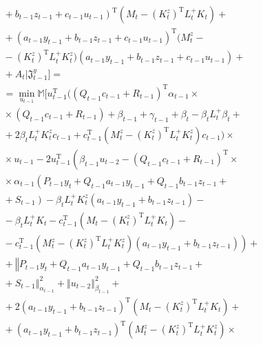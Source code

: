 \begin{multicols}{2}
\noindent
\begin{multline*}
\left.{}+ b_{t-1} z_{t-1} + c_{t-1} u_{t-1} \right)^{\mathrm{T}}
\left(M_t - \left( K_t^z\right)^{\mathrm{T}} L_t^+ K_t \right) +{}\\
{}+ \left( a_{t-1} y_{t-1} + b_{t-1} z_{t-1} + c_{t-1} u_{t-1} \right)^{\mathrm{T}}
\Big(M_t^z -{}\\
{}- \left( K_t^z\right)^{\mathrm{T}} L_t^+ K_t^z \Big)
\left( a_{t-1} y_{t-1} + b_{t-1} z_{t-1} + c_{t-1} u_{t-1} \right) +{}\\
{}+A_t \Big\vert
\mathfrak{J}_{t-1}^y\Big]  ={}\\
= \min\limits_{u_{t-1}} \mathbb{M} \Big[
u_{t-1}^{\mathrm{T}} \Big(
 \left( Q_{t-1} c_{t-1} + R_{t-1}\right)^{\mathrm{T}} \alpha_{t-1}\times\\
 {}\times
\left( Q_{t-1} c_{t-1} + R_{t-1}\right) + \beta_{t-1} + \gamma_{t-1} +
\beta_t -\beta_t L_t^+ \beta_t
+{}\\
{}+ 2 \beta_t L_t^+ K_t^z c_{t-1} + c_{t-1}^{\mathrm{T}}
\left(M_t^z - \left( K_t^z\right)^{\mathrm{T}} L_t^+ K_t^z \right) c_{t-1} %
\Big)\times{}\\
{}\times u_{t-1} - 2 u_{t-1}^{\mathrm{T}} \left(
\beta_{t-1} u_{t-2} - \left(Q_{t-1} c_{t-1} + R_{t-1}\right)^{\mathrm{T}}\times{}\right.\\
{}\times \alpha_{t-1}
\left(P_{t-1} y_t + Q_{t-1} a_{t-1} y_{t-1} + Q_{t-1} b_{t-1} z_{t-1} +{}\right.\\
\left.{}+ S_{t-1} \right) - \beta_t L_t^+ K_t^z \left( a_{t-1} y_{t-1} + b_{t-1} z_{t-1} \right) -{}\\
{}-
\beta_t L_t^+ K_t - c_{t-1}^{\mathrm{T}}
\left(M_t - \left( K_t^z\right)^{\mathrm{T}} L_t^+ K_t \right) -{}\\
\left.{}-c_{t-1}^{\mathrm{T}}\!\left(\!
M_t^z - \left( K_t^z\right)^{\mathrm{T}}\! \!L_t^+ K_t^z \right)\!
\left( a_{t-1} y_{t-1} + b_{t-1} z_{t-1}\right)\!\right)
+{}\\
{}+\left\Vert P_{t-1} y_t + Q_{t-1}a_{t-1} y_{t-1} + Q_{t-1} b_{t-1} z_{t-1}
+ \right.\\
\left.{}+S_{t-1} \right\Vert^2_{\alpha_{t-1}} +
\left\Vert u_{t-2} \right\Vert^2_{\beta_{t-1}} +{}\\
{}+ 2\left( a_{t-1} y_{t-1} + b_{t-1} z_{t-1} \right)^{\mathrm{T}}
\left(M_t - \left( K_t^z\right)^{\mathrm{T}} L_t^+ K_t \right) +{}\\
{}+ \left( a_{t-1} y_{t-1} + b_{t-1} z_{t-1} \right)^{\mathrm{T}}
\left(M_t^z - \left( K_t^z\right)^{\mathrm{T}} L_t^+ K_t^z \right)\times{}\\

\end{multline*}
\end{multicols}
